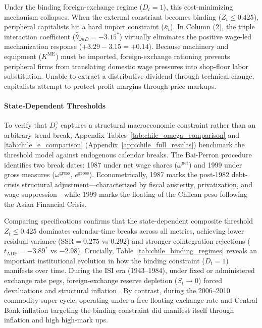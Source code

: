 Under the binding foreign-exchange regime ($D_t = 1$), this cost-minimizing mechanism collapses. When the external constriant becomes binding ($Z_t \le 0.425$), peripheral capitalists hit a hard import constraint ($\bar{\kappa}_t$). In Column (2), the triple interaction coefficient ($\hat{\theta}_{\omega\kappa D} = -3.15^*$) virtually eliminates the positive wage-led mechanization response ($+3.29 - 3.15 = +0.14$). Because machinery and equipment ($K^{\text{ME}}$) must be imported, foreign-exchange rationing prevents peripheral firms from translating domestic wage pressures into shop-floor labor substitution. Unable to extract a distributive dividend through technical change, capitalists attempt to protect profit margins through price markups.

\paragraph{State-Dependent Thresholds} To verify that $D_t^\gamma$ captures a structural macroeconomic constraint rather than an arbitrary trend break, Appendix Tables~\ref{tab:chile_omega_comparison} and \ref{tab:chile_e_comparison} (Appendix~\ref{app:chile_full_results}) benchmark the threshold model against \citet{BaiPerron2003} endogenous calendar breaks. The Bai-Perron procedure identifies two break dates: 1987 under net wage shares ($\omega^{\text{net}}$) and 1999 under gross measures ($\omega^{\text{gross}}$, $e^{\text{gross}}$). Econometrically, 1987 marks the post-1982 debt-crisis structural adjustment—characterized by fiscal austerity, privatization, and wage suppression—while 1999 marks the floating of the Chilean peso following the Asian Financial Crisis.

Comparing specifications confirms that the state-dependent composite threshold $Z_t \le 0.425$ dominates calendar-time breaks across all metrics, achieving lower residual variance ($\text{SSR} = 0.275$ vs $0.292$) and stronger cointegration rejections ($t_{\text{ADF}} = -3.89^*$ vs $-2.98$). Crucially, Table~\ref{tab:chile_binding_regimes} reveals an important institutional evolution in how the binding constraint ($D_t = 1$) manifests over time. During the ISI era (1943--1984), under fixed or administered exchange rate pegs, foreign-exchange reserve depletion ($S_t \to 0$) forced devaluations and structural inflation \citep{Sunkel1958,Prebisch1981}. By contrast, during the 2006--2010 commodity super-cycle, operating under a free-floating exchange rate and Central Bank inflation targeting the binding constraint did manifest itself through inflation and high high-mark ups. 

